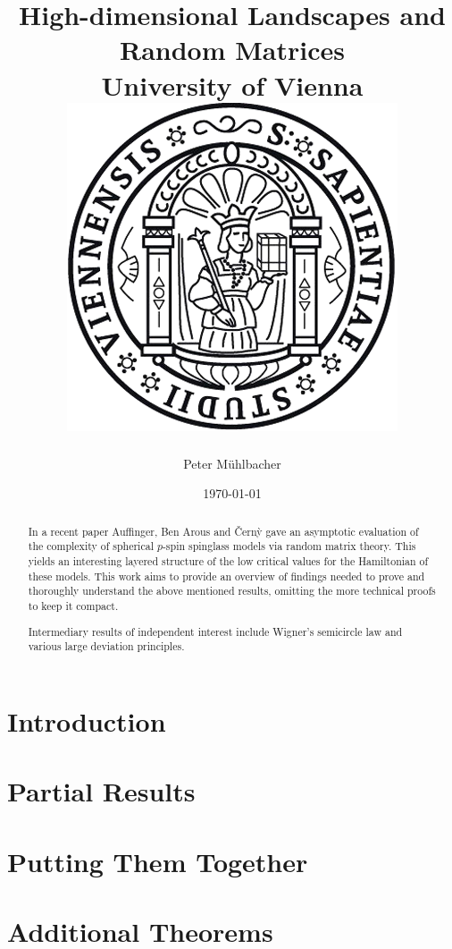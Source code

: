 \documentclass[11pt]{report}
\begin{document}
\title{
	{High-dimensional Landscapes and Random Matrices}\\
	{\large University of Vienna}\\
	\vspace{2ex}
	{\includegraphics{university.png}}
}
\author{Peter Mühlbacher}
\date{\today}
\maketitle

\begin{abstract}
In a recent paper Auffinger, Ben Arous and {\v{C}}ern{\`y} gave an asymptotic evaluation of the complexity of spherical $p$-spin spinglass models via random matrix theory. This yields an interesting layered structure of the low critical values for the Hamiltonian of these models. This work aims to provide an overview of findings needed to prove and thoroughly understand the above mentioned results, omitting the more technical proofs to keep it compact.

Intermediary results of independent interest include Wigner's semicircle law and various large deviation principles.
\end{abstract}

\tableofcontents

\chapter*{Introduction}


\chapter{Partial Results}\label{chap:prerequisites}


\chapter{Putting Them Together}\label{chap:centralidentities}


\appendix
\chapter{Additional Theorems}




\end{document}
